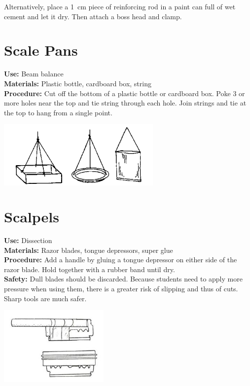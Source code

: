 \begin{multicols}{2}
Alternatively, place a 1~cm piece of reinforcing rod in a paint can full of wet cement and let it dry. Then attach a boss head and clamp.

\section{Scale Pans}
\label{sec:scale-pan}
\vspace{-10pt}
\textbf{Use:} Beam balance\\
\textbf{Materials:} Plastic bottle, cardboard box, string\\
\textbf{Procedure:} Cut off the bottom of a plastic bottle or cardboard box. Poke 3 or more holes near the top and tie string through each hole. Join strings and tie at the top to hang from a single point.
\begin{center}
\includegraphics[width=8cm]{./img/source/scale-pans.png}
\end{center}

\section{Scalpels}
\label{sec:scalpels}
\vspace{-10pt}
\textbf{Use:} Dissection\\
\textbf{Materials:} Razor blades, tongue depressors, super glue\\
\textbf{Procedure:} Add a handle by gluing a tongue depressor on either side of the razor blade. Hold together with a rubber band until dry.\\
\textbf{Safety:} Dull blades should be discarded. Because students need to apply more pressure when using them, there is a greater risk of slipping and thus of cuts. Sharp tools are much safer. 
\begin{center}
\includegraphics[width=0.4\textwidth]{./img/source/scalpel.jpg}
\end{center}


\end{multicols}
